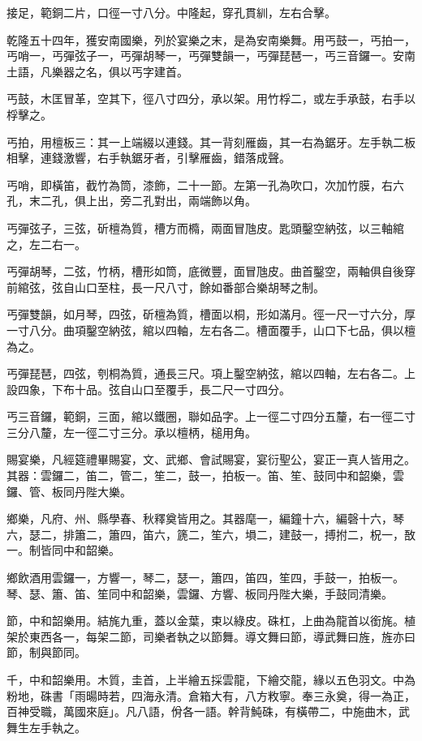 \begin{pinyinscope}
接足，範銅二片，口徑一寸八分。中隆起，穿孔貫紃，左右合擊。

乾隆五十四年，獲安南國樂，列於宴樂之末，是為安南樂舞。用丐鼓一，丐拍一，丐哨一，丐彈弦子一，丐彈胡琴一，丐彈雙韻一，丐彈琵琶一，丐三音鑼一。安南土語，凡樂器之名，俱以丐字建首。

丐鼓，木匡冒革，空其下，徑八寸四分，承以架。用竹桴二，或左手承鼓，右手以桴擊之。

丐拍，用檀板三：其一上端綴以連錢。其一背刻雁齒，其一右為鋸牙。左手執二板相擊，連錢激響，右手執鋸牙者，引擊雁齒，錯落成聲。

丐哨，即橫笛，截竹為筒，漆飾，二十一節。左第一孔為吹口，次加竹膜，右六孔，末二孔，俱上出，旁二孔對出，兩端飾以角。

丐彈弦子，三弦，斫檀為質，槽方而橢，兩面冒虺皮。匙頭鑿空納弦，以三軸綰之，左二右一。

丐彈胡琴，二弦，竹柄，槽形如筒，底微豐，面冒虺皮。曲首鑿空，兩軸俱自後穿前綰弦，弦自山口至柱，長一尺八寸，餘如番部合樂胡琴之制。

丐彈雙韻，如月琴，四弦，斫檀為質，槽面以桐，形如滿月。徑一尺一寸六分，厚一寸八分。曲項鑿空納弦，綰以四軸，左右各二。槽面覆手，山口下七品，俱以檀為之。

丐彈琵琶，四弦，刳桐為質，通長三尺。項上鑿空納弦，綰以四軸，左右各二。上設四象，下布十品。弦自山口至覆手，長二尺一寸四分。

丐三音鑼，範銅，三面，綰以鐵圈，聯如品字。上一徑二寸四分五釐，右一徑二寸三分八釐，左一徑二寸三分。承以檀柄，槌用角。

賜宴樂，凡經筵禮畢賜宴，文、武鄉、會試賜宴，宴衍聖公，宴正一真人皆用之。其器：雲鑼二，笛二，管二，笙二，鼓一，拍板一。笛、笙、鼓同中和韶樂，雲鑼、管、板同丹陛大樂。

鄉樂，凡府、州、縣學春、秋釋奠皆用之。其器麾一，編鐘十六，編磬十六，琴六，瑟二，排簫二，簫四，笛六，篪二，笙六，塤二，建鼓一，搏拊二，柷一，敔一。制皆同中和韶樂。

鄉飲酒用雲鑼一，方響一，琴二，瑟一，簫四，笛四，笙四，手鼓一，拍板一。琴、瑟、簫、笛、笙同中和韶樂，雲鑼、方響、板同丹陛大樂，手鼓同清樂。

節，中和韶樂用。結旄九重，蓋以金葉，束以綠皮。硃杠，上曲為龍首以銜旄。植架於東西各一，每架二節，司樂者執之以節舞。導文舞曰節，導武舞曰旌，旌亦曰節，制與節同。

千，中和韶樂用。木質，圭首，上半繪五採雲龍，下繪交龍，緣以五色羽文。中為粉地，硃書「雨暘時若，四海永清。倉箱大有，八方敉寧。奉三永奠，得一為正，百神受職，萬國來庭」。凡八語，佾各一語。幹背魨硃，有橫帶二，中施曲木，武舞生左手執之。


\end{pinyinscope}
